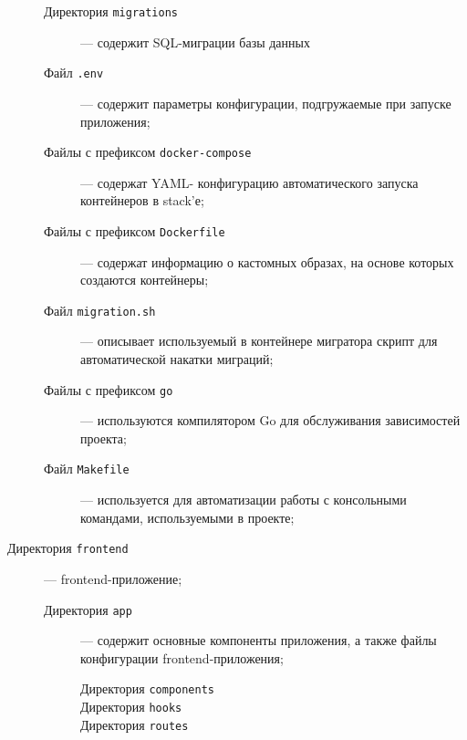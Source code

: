 \documentclass[diploma]{SCWorks}
\begin{document}
\begin{description}
\begin{description}
    \item[Директория \texttt{migrations}] — содержит SQL-миграции базы данных
    \item[Файл \texttt{.env}] — содержит параметры конфигурации, подгружаемые 
    при запуске приложения;
    \item[Файлы с префиксом \texttt{docker-compose}] — содержат YAML-
    конфигурацию автоматического запуска контейнеров в stack'е;
    \item[Файлы с префиксом \texttt{Dockerfile}] — содержат информацию о 
    кастомных образах, на основе которых создаются контейнеры;
    \item[Файл \texttt{migration.sh}] — описывает используемый в контейнере 
    мигратора скрипт для автоматической накатки миграций;
    \item[Файлы с префиксом \texttt{go}] — используются компилятором Go для 
    обслуживания зависимостей проекта;
    \item[Файл \texttt{Makefile}] — используется для автоматизации работы с 
    консольными командами, используемыми в проекте;
\end{description}

\item[Директория \texttt{frontend}] — frontend-приложение;
\begin{description}
    \item[Директория \texttt{app}] — содержит основные компоненты приложения,
    а также файлы конфигурации frontend-приложения;
    \begin{description}
        \item[Директория \texttt{components}]
        \item[Директория \texttt{hooks}]
        \item[Директория \texttt{routes}]
    \end{description} 
\end{description}
\end{description}
\end{document}

